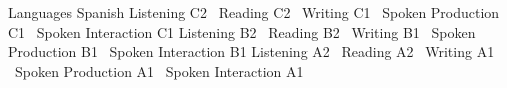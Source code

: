 \begin{rubric}{Languages}
\noentry{~}
Spanish
\entry*[English]
Listening C2 \textbar\ Reading C2 \textbar\ Writing C1 \textbar\ Spoken Production C1 \textbar\ Spoken Interaction C1
\entry*[French]
Listening B2 \textbar\ Reading B2 \textbar\ Writing B1 \textbar\ Spoken Production B1 \textbar\ Spoken Interaction B1
\entry*[German]
Listening A2 \textbar\ Reading A2 \textbar\ Writing A1 \textbar\ Spoken Production A1 \textbar\ Spoken Interaction A1
\end{rubric}

